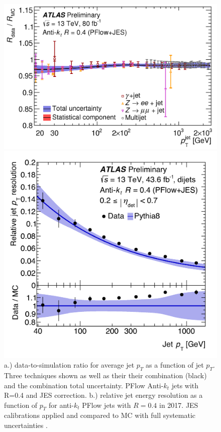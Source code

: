 \begin{figure}[!h]
    \centering
  \begin{minipage}[b]{0.5\textwidth}
  \includegraphics[width=\textwidth]{Pictures/ParticleFlowScale.png}
  \end{minipage}
  \hspace{.5cm}
  \begin{minipage}[b]{0.4\textwidth}
    \includegraphics[width=\textwidth]{Pictures/ParticleFlowResolution.png}
  \end{minipage}
    \caption{ a.) data-to-simulation ratio for average jet $p_T$ as a function of jet $p_T$. Three techniques shown as well as their their combination (black) and the combination total uncertainty. PFlow Anti-$k_t$ jets with R=0.4 and JES correction. b.) relative jet energy resolution as a function of $p_T$ for anti-$k_t$ PFlow jets with $R=0.4$ in 2017. JES calibrations applied and compared to MC with full systematic uncertainties \cite{JETEtmiss}.}
    \label{fig:ScaleRes}
\end{figure}

